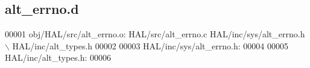 \subsection{alt\+\_\+errno.\+d}
\label{alt__errno_8d_source}

\begin{DoxyCode}
00001 obj/HAL/src/alt_errno.o: HAL/src/alt_errno.c HAL/inc/sys/alt_errno.h \(\backslash\)
 HAL/inc/alt\_types.h
00002 
00003 HAL/inc/sys/alt_errno.h:
00004 
00005 HAL/inc/alt\_types.h:
00006 \end{DoxyCode}
